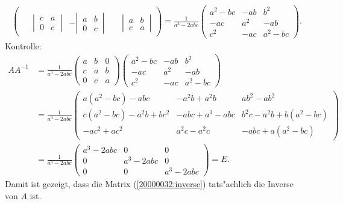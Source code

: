 \begin{loesung}
\begin{align}
\begin{pmatrix}
			\\[13pt]
\phantom{-}\left|\,\begin{matrix}c&a\\0&c\end{matrix}\,\right|
	&-\left|\,\begin{matrix}a&b\\0&c\end{matrix}\,\right|
		&\phantom{-}\left|\,\begin{matrix}a&b\\c&a\end{matrix}\,\right|
\end{pmatrix}
=
\frac1{a^3-2abc}\begin{pmatrix}
a^2-bc&-ab&b^2\\
-ac&a^2&-ab\\
c^2&-ac&a^2-bc
\end{pmatrix}.
\label{20000032:inverse}
\end{align}
Kontrolle:
\begin{align*}
AA^{-1}
&=
\frac1{a^3-2abc}
\begin{pmatrix}
a&b&0\\
c&a&b\\
0&c&a
\end{pmatrix}
\begin{pmatrix}
a^2-bc&-ab&b^2\\
-ac&a^2&-ab\\
c^2&-ac&a^2-bc
\end{pmatrix}
\\
&=
\frac1{a^3-2abc}
\begin{pmatrix}
a(a^2-bc)-abc      &-a^2b+a^2b  &ab^2-ab^2          \\
c(a^2-bc)-a^2b+bc^2&-abc+a^3-abc&b^2c-a^2b+b(a^2-bc)\\
-ac^2+ac^2         &a^2c-a^2c   &-abc+a(a^2-bc)
\end{pmatrix}
\\
&=
\frac1{a^3-2abc}
\begin{pmatrix}
a^3-2abc&0&0\\
0&a^3-2abc&0\\
0&0&a^3-2abc
\end{pmatrix}
=E.
\end{align*}
Damit ist gezeigt, dass die Matrix (\ref{20000032:inverse}) tats"achlich
die Inverse von $A$ ist.
\end{loesung}
